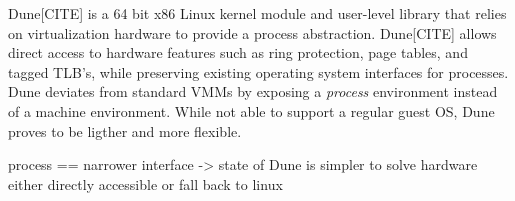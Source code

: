 Dune[CITE] is a 64 bit x86 Linux kernel module and user-level library that relies on virtualization hardware to provide a process abstraction.
Dune[CITE] allows direct access to hardware features such as ring protection, page tables, and tagged TLB's, while preserving existing operating system interfaces for processes.
Dune deviates from standard VMMs by exposing a \textit{process} environment instead of a machine environment.
While not able to support a regular guest OS, Dune proves to be ligther and more flexible.


process == narrower interface -> state of Dune is simpler to solve
hardware either directly accessible or fall back to linux

